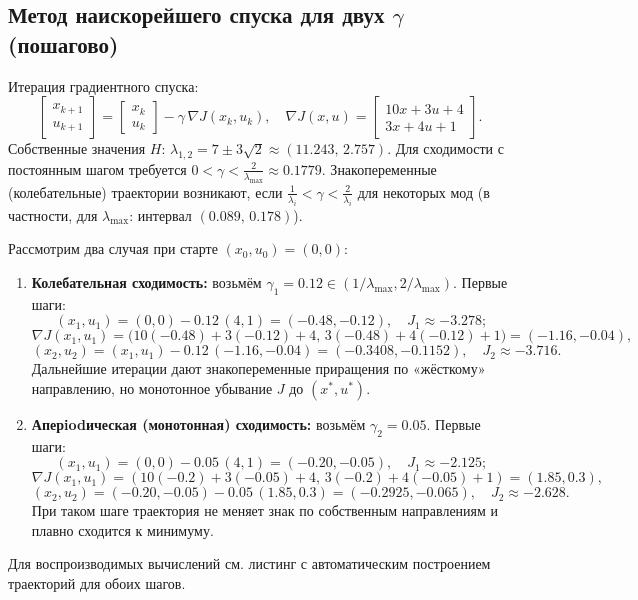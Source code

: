 \subsection{Метод наискорейшего спуска для двух \(\gamma\) (пошагово)}
Итерация градиентного спуска:
\[
\begin{bmatrix}x_{k+1}\\ u_{k+1}\end{bmatrix}=\begin{bmatrix}x_k\\ u_k\end{bmatrix}-\gamma\,\nabla J(x_k,u_k),\quad \nabla J(x,u)=\begin{bmatrix}10x+3u+4\\3x+4u+1\end{bmatrix}.
\]
Собственные значения \(H\): \(\lambda_{1,2}=7\pm3\sqrt{2}\approx(11.243,\,2.757)\). Для сходимости с постоянным шагом требуется \(0<\gamma<\tfrac{2}{\lambda_{\max}}\approx0.1779\). Знакопеременные (колебательные) траектории возникают, если \(\tfrac{1}{\lambda_i}<\gamma<\tfrac{2}{\lambda_i}\) для некоторых мод (в частности, для \(\lambda_{\max}\): интервал \((0.089,\,0.178)\)).

Рассмотрим два случая при старте \((x_0,u_0)=(0,0)\):
\begin{enumerate}
 \item \textbf{Колебательная сходимость:} возьмём \(\gamma_1=0.12\in(1/\lambda_{\max},2/\lambda_{\max})\). Первые шаги:
 \[
 (x_1,u_1)=(0,0)-0.12\,(4,1)=(-0.48,-0.12),\quad J_1\approx-3.278;
 \]
 \[
 \nabla J(x_1,u_1)=\big(10(-0.48)+3(-0.12)+4,\,3(-0.48)+4(-0.12)+1\big)=(-1.16,-0.04),
 \]
 \[
 (x_2,u_2)=(x_1,u_1)-0.12\,(-1.16,-0.04)=(-0.3408,-0.1152),\quad J_2\approx-3.716.
 \]
 Дальнейшие итерации дают знакопеременные приращения по «жёсткому» направлению, но монотонное убывание \(J\) до \((x^{\ast},u^{\ast})\).
 \item \textbf{Аперiodическая (монотонная) сходимость:} возьмём \(\gamma_2=0.05\). Первые шаги:
 \[
 (x_1,u_1)=(0,0)-0.05\,(4,1)=(-0.20,-0.05),\quad J_1\approx-2.125;
 \]
 \[
 \nabla J(x_1,u_1)=(10(-0.2)+3(-0.05)+4,\,3(-0.2)+4(-0.05)+1)=(1.85,0.3),
 \]
 \[
 (x_2,u_2)=(-0.20,-0.05)-0.05\,(1.85,0.3)=(-0.2925,-0.065),\quad J_2\approx-2.628.
 \]
 При таком шаге траектория не меняет знак по собственным направлениям и плавно сходится к минимуму.
\end{enumerate}
Для воспроизводимых вычислений см. листинг с автоматическим построением траекторий для обоих шагов.

